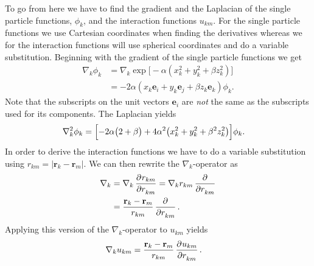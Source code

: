 \documentclass[
    a4paper, aps, twocolumn, floatfix, superscriptaddress]{revtex4-1}
\newcommand{\vf}{\mathbf}
\newcommand{\1}{\mathds{1}}
\begin{document}
            To go from here we have to find the gradient and the Laplacian of
            the single particle functions, $\phi_k$, and the interaction
            functions $u_{km}$. For the single particle functions we use
            Cartesian coordinates when finding the derivatives whereas we for
            the interaction functions will use spherical coordinates and do a
            variable substitution. Beginning with the gradient of the single
            particle functions we get
            \begin{align}
                \nabla_k\phi_k
                &=
                \nabla_k\exp\bigl[
                    -\alpha(x_k^2 + y_k^2 + \beta z_k^2)
                \bigr] \\
                &=
                -2\alpha
                (x_k\vf{e}_i + y_k\vf{e}_j + \beta z_k\vf{e}_k)
                \phi_k.
            \end{align}
            Note that the subscripts on the unit vectors $\vf{e}_i$ are
            \textit{not} the same as the subscripts used for its components. The
            Laplacian yields
            \begin{align}
                \nabla_k^2\phi_k
                &=
                \Bigl[
                    -2\alpha
                    \big(
                        2 + \beta
                    \bigr)
                    + 4\alpha^2
                    \bigl(
                        x_k^2 + y_k^2 + \beta^2z_k^2
                    \bigr)
                \Bigr]
                \phi_k.
            \end{align}
            In order to derive the interaction functions we have to do a
            variable substitution using $r_{km} = |\vf{r}_k - \vf{r}_m|$. We can
            then rewrite the $\nabla_k$-operator as
            \begin{align}
                \nabla_k
                &=
                \nabla_k
                \dpd[]{r_{km}}{r_{km}}
                =
                \nabla_k r_{km} \dpd[]{}{r_{km}}
                \\
                &=
                \frac{\vf{r}_k - \vf{r}_m}{r_{km}}\dpd[]{}{r_{km}}.
            \end{align}
            Applying this version of the $\nabla_k$-operator to $u_{km}$ yields
            \begin{align}
                \nabla_k u_{km}
                &=
                \frac{\vf{r}_k - \vf{r}_m}{r_{km}}
                \dpd[]{u_{km}}{r_{km}}.
            \end{align}
\end{document}
